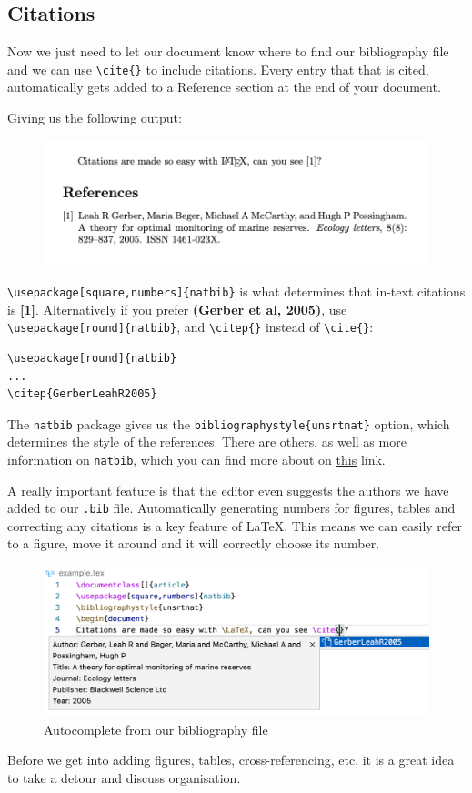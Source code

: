 \subsection{Citations}
Now we just need to let our document know where to find our bibliography file and we can use \verb|\cite{}| to include citations.
Every entry that that is cited, automatically gets added to a Reference section at the end of your document.


Giving us the following output:
\begin{figure}[h]
  \centering
    \includegraphics[]{figures/references.png}
  \label{fig:references}
\end{figure}

\verb|\usepackage[square,numbers]{natbib}| is what determines that in-text citations is \textbf{[1]}.
Alternatively if you prefer \textbf{(Gerber et al, 2005)}, use \verb|\usepackage[round]{natbib}|, and \verb|\citep{}| instead of \texttt{\textbackslash cite\{\}}:
\begin{lstlisting}
\usepackage[round]{natbib}
...
\citep{GerberLeahR2005}
\end{lstlisting}

The \verb|natbib| package gives us the \verb|bibliographystyle{unsrtnat}| option, which determines the style of the references.
There are others, as well as more information on \verb|natbib|, which you can find more about on \href{https://ftp.eq.uc.pt/software/TeX/macros/latex/contrib/natbib/natnotes.pdf}{this} link. 

A really important feature is that the editor even suggests the authors we have added to our \verb|.bib| file.
Automatically generating numbers for figures, tables and correcting any citations is a key feature of LaTeX.
This means we can easily refer to a figure, move it around and it will correctly choose its number.
\begin{figure}[h]
  \centering
  \includegraphics[width=\textwidth]{figures/intellisense.png}
  \caption{Autocomplete from our bibliography file}
  \label{fig:intellisense}
\end{figure}

Before we get into adding figures, tables, cross-referencing, etc, it is a great idea to take a detour and discuss organisation.